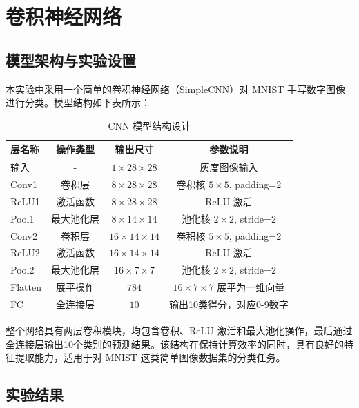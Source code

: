 \documentclass[12pt,a4paper]{article}
\begin{document}
\section{卷积神经网络}

\subsection{模型架构与实验设置}

本实验中采用一个简单的卷积神经网络（SimpleCNN）对 MNIST 手写数字图像进行分类。模型结构如下表所示：

\begin{table}[H]
  \centering
  \caption{CNN 模型结构设计}
  \begin{tabular}{lccc}
    \toprule
    层名称 & 操作类型 & 输出尺寸 & 参数说明 \\\midrule
    输入     & -               & $1 \times 28 \times 28$ & 灰度图像输入 \\\midrule
    Conv1    & 卷积层         & $8 \times 28 \times 28$ & 卷积核 $5\times5$, padding=2 \\
    ReLU1    & 激活函数       & $8 \times 28 \times 28$ & ReLU 激活 \\
    Pool1    & 最大池化层     & $8 \times 14 \times 14$ & 池化核 $2\times2$, stride=2 \\\midrule
    Conv2    & 卷积层         & $16 \times 14 \times 14$ & 卷积核 $5\times5$, padding=2 \\
    ReLU2    & 激活函数       & $16 \times 14 \times 14$ & ReLU 激活 \\
    Pool2    & 最大池化层     & $16 \times 7 \times 7$ & 池化核 $2\times2$, stride=2 \\\midrule
    Flatten  & 展平操作       & $784$ & $16 \times 7 \times 7$ 展平为一维向量 \\
    FC       & 全连接层       & $10$ & 输出10类得分，对应0-9数字 \\
    \bottomrule
  \end{tabular}
  \label{tab:cnn-structure}
\end{table}

整个网络具有两层卷积模块，均包含卷积、ReLU 激活和最大池化操作，最后通过全连接层输出10个类别的预测结果。该结构在保持计算效率的同时，具有良好的特征提取能力，适用于对 MNIST 这类简单图像数据集的分类任务。

\subsection{实验结果}
\end{document}
